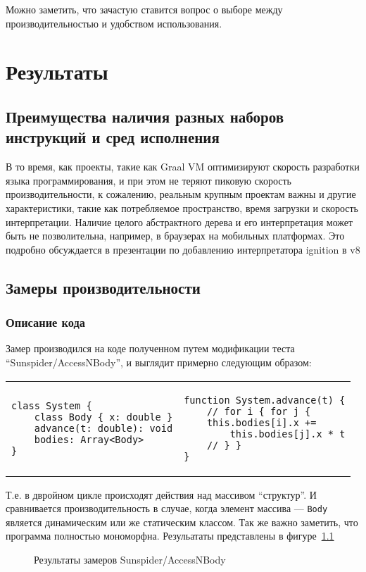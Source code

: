 \documentclass[times,specification,annotation]{itmo-student-thesis}
\begin{document}
\chapterconclusion
Можно заметить, что зачастую ставится вопрос о выборе между производительностью и удобством использования.

\chapter{Результаты}

\section{Преимущества наличия разных наборов инструкций и сред исполнения} \label{sec:why-not-graal}
В то время, как проекты, такие как Graal VM оптимизируют скорость разработки языка программирования, и при этом не теряют пиковую скорость производительности, к сожалению, реальным крупным проектам важны и другие характеристики, такие как потребляемое пространство, время загрузки и скорость интерпретации. Наличие целого абстрактного дерева и его интерпретация может быть не позволительна, например, в браузерах на мобильных платформах. Это подробно обсуждается в презентации по добавлению интерпретатора ignition в v8 \cite{ignition-iterpreter}

\section{Замеры производительности}
\subsection{Описание кода}
Замер производился на коде полученном путем модификации теста ``Sunspider/AccessNBody'', и выглядит примерно следующим образом:\\
\begin{center}
\begin{tabular}[t]{p{}|p{}}
\begin{lstlisting}
class System {
	class Body { x: double }
	advance(t: double): void
	bodies: Array<Body>
}
\end{lstlisting} &
\begin{lstlisting}
function System.advance(t) {
	// for i { for j {
	this.bodies[i].x +=
		this.bodies[j].x * t
	// } }
}
\end{lstlisting}
\end{tabular}
\end{center}

Т.е. в двройном цикле происходят действия над массивом ``структур''. И сравнивается производительность в случае, когда элемент массива --- \texttt{Body} является динамическим или же статическим классом. Так же важно заметить, что программа полностью мономорфна. Резульататы представлены в фигуре~\ref{fig:accessnbodyres}
\begin{figure}[!h]
	\caption{Результаты замеров Sunspider/AccessNBody}\label{fig:accessnbodyres}
	\resizebox{\textwidth}{!}{}
\end{figure}
\end{document}
